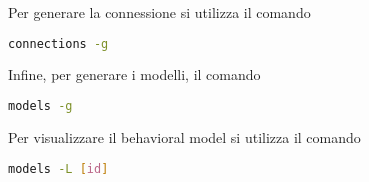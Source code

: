 \documentclass[../main.tex]{subfiles}
\begin{document}
Per generare la connessione si utilizza il comando
\begin{lstlisting}[language=bash]
	connections -g	
\end{lstlisting}

Infine, per generare i modelli, il comando
\begin{lstlisting}[language=bash]
	models -g	
\end{lstlisting}

Per visualizzare il behavioral model si utilizza il comando
\begin{lstlisting}[language=bash]
	models -L [id]	
\end{lstlisting}
\end{document}
